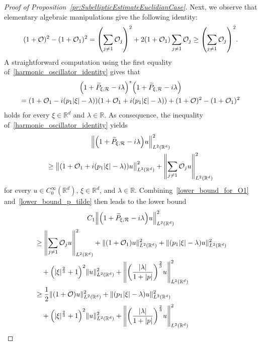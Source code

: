 \documentclass[10pt]{amsart}
\theoremstyle{definition}\newtheorem{defi}[theo]{Definition}\newtheorem{rema}[theo]{Remark}\newtheorem{exam}[theo]{Example}\newtheorem{exem}[theo]{Example}\newtheorem{nota}[theo]{Notation}
\newcommand{\R}{\mathbb{R}}
\newcommand{\clO}{\mathcal{O}}
\newcommand{\clR}{\mathcal{R}}
\newcommand{\abs}[1]{\left| #1 \right|}
\newcommand\norm[1]{\left\lVert#1\right\rVert}
\let\originalleft\left
\let\originalright\right
\renewcommand{\left}{\mathopen{}\mathclose\bgroup\originalleft}
\renewcommand{\right}{\aftergroup\egroup\originalright}
\begin{document}
\begin{proof}[{Proof of Proposition~\ref{pr:SubellipticEstimateEuclidianCase}}]
Next, we observe that elementary algebraic manipulations give the following identity:
\begin{equation}\label{harmonic_oscillator_identity}
(1+\clO)^2-(1+\clO_1)^2 = \left(\sum_{j \neq 1} \clO_j \right)^2 + 2(1+\clO_1) \sum_{j \neq 1} \clO_j\geq \left(\sum_{j \neq 1} \clO_j \right)^2.
\end{equation}
A straightforward computation using the first equality of~\eqref{harmonic_oscillator_identity} gives that
\begin{multline}\label{positive_operator_identity}
\left(1+\widetilde{P}_{\xi, \clR}-i\lambda\right)^*\left(1+\widetilde{P}_{\xi, \clR}-i\lambda\right) \\= (1+\clO_1-i(p_1 \abs{\xi}-\lambda))(1+\clO_1+i(p_1 \abs{\xi}-\lambda))
+(1+\clO)^2-(1+\clO_1)^2
\end{multline}
holds for every $\xi \in \R^d$ and $\lambda \in \R$. As consequence, the inequality of~\eqref{harmonic_oscillator_identity} yields
\begin{multline}\label{lower_bound_p_tilde}
\norm{\left(1+\widetilde{P}_{\xi, \clR}-i\lambda\right)u}^2_{L^2(\R^d)}\\
\geq \bigl\|(1+\clO_1+i(p_1 \abs{\xi}-\lambda))u\bigr\|^2_{L^2(\R^d)} + \norm{\sum_{j\neq 1}\clO_j u}^{2}_{L^2(\R^d)}
\end{multline}
for every $u \in C^\infty_0(\R^d)$, $\xi \in \R^d$, and $\lambda \in \R$. Combining~\eqref{lower_bound_for_O1} and~\eqref{lower_bound_p_tilde} then leads to the lower bound
\begin{multline}\label{estimate_for_P_xi_R}
C_1\left\| \left(1+\widetilde{P}_{\xi,\clR}-i\lambda\right)u\right\|^{2}_{L^2(\R^d)}
\\
\begin{aligned}
&\geq \left\| \sum_{j\neq 1}\clO_j u\right\|^{2}_{L^2(\R^d)} +\|(1+\clO_{1})u\|^2_{L^2(\R^d)} +\| (p_{1}|\xi|-\lambda)u\|^{2}_{L^2(\R^d)}
\\
&\quad+ \left(|\xi|^{\frac{2}{3}}+1\right)^{2}\|u\|^{2}_{L^2(\R^d)} +
\left\|
\left(
\frac{|\lambda|}{1+|p|}
\right)^{\frac{2}{3}} u
\right\|^{2}_{L^2(\R^{d})}
\\
&\geq \frac{1}{2}\| (1+\clO) u\|^{2}_{L^2(\R^d)} +\| (p_{1}|\xi|-\lambda)u\|^{2}_{L^2(\R^d)}
\\
&\quad+ \left(|\xi|^{\frac{2}{3}}+1\right)^{2}\|u\|^{2}_{L^2(\R^d)} +
\left\|
\left(
\frac{|\lambda|}{1+|p|}
\right)^{\frac{2}{3}} u
\right\|^{2}_{L^2(\R^{d})}
\end{aligned}
\end{multline}

\end{proof}
\end{document}
